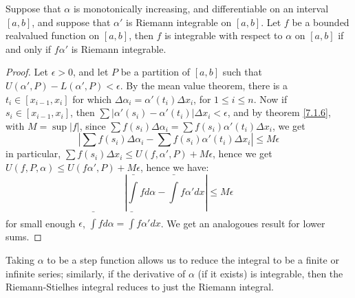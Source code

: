 \begin{theorem}\label{7.2.5}
    Suppose that $\alpha$ is monotonically increasing, and differentiable on an
    interval $[a,b]$, and suppose that  $\alpha'$ is Riemann integrable on
    $[a,b]$. Let $f$ be a bounded realvalued function on  $[a,b]$, then  $f$ is
    integrable with respect to  $\alpha$ on  $[a,b]$ if and only if  $f\alpha'$
    is Riemann integrable.
\end{theorem}
\begin{proof}
    Let $\epsilon>0$, and let  $P$ be a partition of  $[a,b]$ such that
    $U(\alpha',P)-L(\alpha',P)<\epsilon$. By the mean value theorem, there is a
    $t_i \in [x_{i-1},x_i]$ for which $\Delta{\alpha_i}=\alpha'(t_i)
    \Delta{x_i}$, for $1 \leq i \leq n$. Now if $s_i \in [x_{i-1},x_i]$, then
    $\sum{|\alpha'(s_i)-\alpha'(t_i)| \Delta{x_i}}<\epsilon$, and by theorem
    \ref{7.1.6}, with  $M=\sup{|f|}$, since  $\sum{f(s_i)
    \Delta{\alpha_i}}=\sum{f(s_i)\alpha'(t_i) \Delta{x_i}}$, we get
        \begin{equation*}
            |\sum{f(s_i) \Delta{\alpha_i}}-\sum{f(s_i)\alpha'(t_i) \Delta{x_i}}|
            \leq M\epsilon
        \end{equation*}
        in particular, $\sum{f(s_i) \Delta{x_i}} \leq U(f,\alpha',P)+M\epsilon$,
        hence we get  $U(f,P,\alpha) \leq U(f\alpha',P)+M\epsilon$, hence we
        have:
            \begin{equation*}
                |\bar{\int}{f} d\alpha-\bar{\int}{f\alpha'} dx| \leq M\epsilon
            \end{equation*}
        for small enough $\epsilon$, $\bar{\int}{f} d\alpha=\bar{\int}{f\alpha'} dx$.
        We get an analogoues result for lower sums.
\end{proof}
\begin{remark}
    Taking $\alpha$ to be a step function allows us to reduce the integral to be
    a finite or infinite series; similarly, if the derivative of  $\alpha$  (if
    it exists) is integrable, then the Riemann-Stielhes integral reduces to just
    the Riemann integral.
\end{remark}

